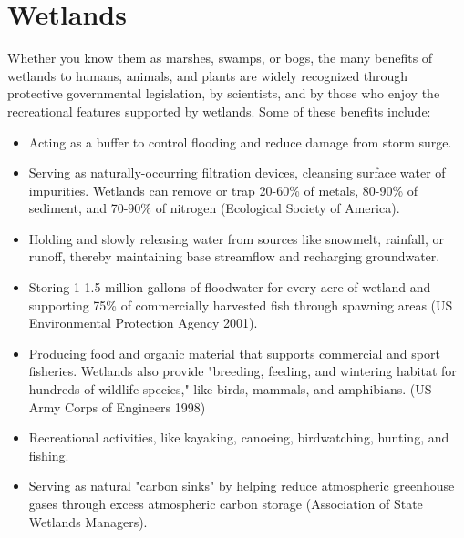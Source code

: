 \chapter{Wetlands}\label{subsec:wetland}
Whether you know them as marshes, swamps, or bogs, the many benefits of 
wetlands to humans, animals, and plants are widely recognized through 
protective governmental legislation, by scientists, and by those who enjoy the 
recreational features supported by wetlands. Some of these benefits include:
\begin{itemize}
    \item Acting as a buffer to control flooding and reduce damage from storm 
    surge.
    \item Serving as naturally-occurring filtration devices, cleansing surface 
    water of impurities.  Wetlands can remove or trap 20-60\% of metals, 80-90\% 
    of sediment, and 70-90\% of nitrogen (Ecological Society of America).
    \item Holding and slowly releasing water from sources like snowmelt, 
    rainfall, or runoff, thereby maintaining base streamflow and recharging 
    groundwater.
    \item Storing 1-1.5 million gallons of floodwater for every acre of wetland
    and supporting 75\% of commercially harvested fish through spawning areas 
    (US Environmental Protection Agency 2001).
    \item Producing food and organic material that supports commercial and 
    sport fisheries. Wetlands also provide "breeding, feeding, and wintering 
    habitat for hundreds of wildlife species," like birds, mammals, and 
    amphibians. (US Army Corps of Engineers 1998)
    \item Recreational activities, like kayaking, canoeing, birdwatching, 
    hunting, and fishing.
    \item Serving as natural "carbon sinks" by helping reduce atmospheric
    greenhouse gases through excess atmospheric carbon storage (Association 
    of State Wetlands Managers).
\end{itemize}

